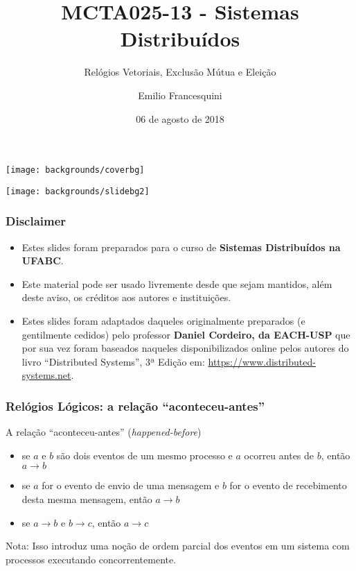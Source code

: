 \documentclass[Ligatures=TeX,table,brazil,svgnames,usetotalslideindicator,compress,10pt]{beamer}
\title{MCTA025-13 - Sistemas Distribuídos}
\subtitle{Relógios Vetoriais, Exclusão Mútua e Eleição}
\author{Emilio Francesquini}
\institute{Centro de Matemática, Computação e Cognição\\ Universidade Federal do ABC}
\date{06 de agosto de 2018}
\newcommand{\setcoverbg}{
  \setbeamertemplate{background}
  {\texttt{[image: backgrounds/coverbg]}}
}
\newcommand{\setsectionbg}{
  \setbeamertemplate{background}
  {\texttt{[image: backgrounds/slidebg2]}}
}
\begin{document}
\setcoverbg
\maketitle

\setsectionbg

\begin{frame}
  \frametitle{Disclaimer}
  \begin{itemize}
  \item Estes slides foram preparados para o curso de \textbf{Sistemas
      Distribuídos na UFABC}.
  \item Este material pode ser usado livremente desde que sejam
    mantidos, além deste aviso, os créditos aos autores e
    instituições.
  \item Estes slides foram adaptados daqueles originalmente preparados
    (e gentilmente cedidos) pelo professor \textbf{Daniel Cordeiro, da
      EACH-USP} que por sua vez foram baseados naqueles
    disponibilizados online pelos autores do livro ``Distributed
    Systems'', 3ª Edição em:
    \url{https://www.distributed-systems.net}.
  \end{itemize}
\end{frame}


\begin{frame}
  \frametitle{Relógios Lógicos: a relação ``aconteceu-antes''}

  \begin{block}{A relação ``aconteceu-antes'' (\textit{happened-before})}
    \begin{itemize}
    \item se $a$ e $b$ são dois eventos de um mesmo processo e $a$ ocorreu antes de $b$, então $a \rightarrow b$
    \item se $a$ for o evento de envio de uma mensagem e $b$ for o evento de recebimento desta mesma mensagem, então $a \rightarrow b$
    \item se $a \rightarrow b$ e $b \rightarrow c$, então $a \rightarrow c$
    \end{itemize}
  \end{block}

  \begin{alertblock}{Nota:}
    Isso introduz uma noção de \alert{ordem parcial dos eventos} em um sistema com processos executando concorrentemente.
  \end{alertblock}

\end{frame}
\end{document}

